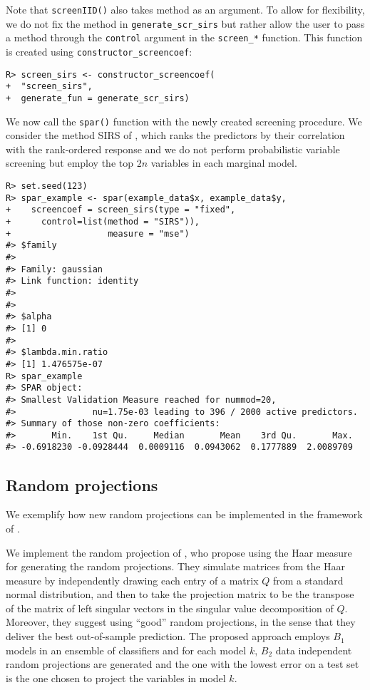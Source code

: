 \documentclass[
  article]{jss}
\begin{document}
Note that \texttt{screenIID()} also takes method as an argument. To
allow for flexibility, we do not fix the method in
\texttt{generate\_scr\_sirs} but rather allow the user to pass a method
through the \texttt{control} argument in the \texttt{screen\_*}
function. This function is created using
\texttt{constructor\_screencoef}:

\begin{verbatim}
R> screen_sirs <- constructor_screencoef(
+  "screen_sirs", 
+  generate_fun = generate_scr_sirs)
\end{verbatim}

We now call the \texttt{spar()} function with the newly created
screening procedure. We consider the method SIRS of
\citet{zhu2011model}, which ranks the predictors by their correlation
with the rank-ordered response and we do not perform probabilistic
variable screening but employ the top \(2n\) variables in each marginal
model.

\begin{verbatim}
R> set.seed(123)      
R> spar_example <- spar(example_data$x, example_data$y,
+    screencoef = screen_sirs(type = "fixed",
+      control=list(method = "SIRS")),
+                   measure = "mse")
#> $family
#> 
#> Family: gaussian 
#> Link function: identity 
#> 
#> 
#> $alpha
#> [1] 0
#> 
#> $lambda.min.ratio
#> [1] 1.476575e-07
R> spar_example
#> SPAR object:
#> Smallest Validation Measure reached for nummod=20,
#>               nu=1.75e-03 leading to 396 / 2000 active predictors.
#> Summary of those non-zero coefficients:
#>       Min.    1st Qu.     Median       Mean    3rd Qu.       Max. 
#> -0.6918230 -0.0928444  0.0009116  0.0943062  0.1777889  2.0089709
\end{verbatim}

\subsection{Random projections}\label{random-projections-1}

We exemplify how new random projections can be implemented in the
framework of .

We implement the random projection of \citet{cannings2017random}, who
propose using the Haar measure for generating the random projections.
They simulate matrices from the Haar measure by independently drawing
each entry of a matrix \(Q\) from a standard normal distribution, and
then to take the projection matrix to be the transpose of the matrix of
left singular vectors in the singular value decomposition of \(Q\).
Moreover, they suggest using ``good'' random projections, in the sense
that they deliver the best out-of-sample prediction. The proposed
approach employs \(B_1\) models in an ensemble of classifiers and for
each model \(k\), \(B_2\) data independent random projections are
generated and the one with the lowest error on a test set is the one
chosen to project the variables in model \(k\).
\end{document}
